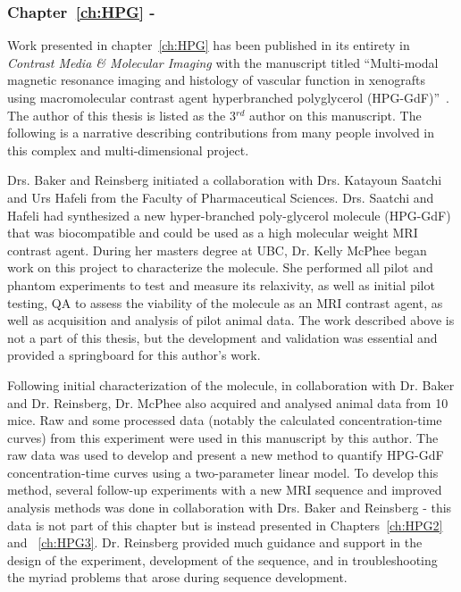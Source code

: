 \subsubsection{Chapter~\ref{ch:HPG} - }

Work presented in chapter~\ref{ch:HPG} has been published in its entirety in \emph{Contrast Media \& Molecular Imaging} with the manuscript titled ``Multi-modal magnetic resonance imaging and histology of vascular function in xenografts using macromolecular contrast agent hyperbranched polyglycerol (\acs{HPG-GdF})''~\cite{Baker:2015cob}.
The author of this thesis is listed as the 3$^{rd}$ author on this manuscript.
The following is a narrative describing contributions from many people involved in this complex and multi-dimensional project.

Drs. Baker and Reinsberg initiated a collaboration with Drs. Katayoun Saatchi and Urs Hafeli from the Faculty of Pharmaceutical Sciences.
Drs. Saatchi and Hafeli had synthesized a new hyper-branched poly-glycerol molecule (\acs{HPG-GdF}) that was biocompatible and could be used as a high molecular weight MRI contrast agent.
During her masters degree at UBC, Dr. Kelly McPhee began work on this project to characterize the molecule. 
She performed all pilot and phantom experiments to test and measure its relaxivity, as well as initial pilot testing, QA to assess the viability of the molecule as an MRI contrast agent, as well as acquisition and analysis of pilot animal data.
The work described above is not a part of this thesis, but the development and validation was essential and provided a springboard for this author's work.

Following initial characterization of the molecule, in collaboration with Dr. Baker and Dr. Reinsberg, Dr. McPhee also acquired and analysed animal data from 10 mice. 
Raw and some processed data (notably the calculated concentration-time curves) from this experiment were used in this manuscript by this author.
The raw data was used to develop and present a new method to quantify \acs{HPG-GdF} concentration-time curves using a two-parameter linear model.
To develop this method, several follow-up experiments with a new MRI sequence and improved analysis methods was done in collaboration with Drs. Baker and Reinsberg - this data is not part of this chapter but is instead presented in Chapters~\ref{ch:HPG2} and ~\ref{ch:HPG3}.
Dr. Reinsberg provided much guidance and support in the design of the experiment, development of the sequence, and in troubleshooting the myriad problems that arose during sequence development.


